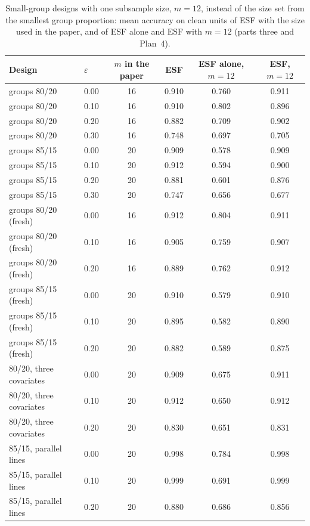 \begin{table}[htbp]
\centering
\small
\caption{Small-group designs with one subsample size, $m=12$, instead of the size set from the smallest group proportion: mean accuracy on clean units of ESF with the size used in the paper, and of ESF alone and ESF with $m=12$ (parts three and Plan~4).}
\label{tab:S28}
\begin{tabular}{llcccc}
\toprule
Design & $\varepsilon$ & $m$ in the paper & ESF & ESF alone, $m=12$ & ESF, $m=12$ \\
\midrule
groups 80/20 & 0.00 & 16 & 0.910 & 0.760 & 0.911 \\
groups 80/20 & 0.10 & 16 & 0.910 & 0.802 & 0.896 \\
groups 80/20 & 0.20 & 16 & 0.882 & 0.709 & 0.902 \\
groups 80/20 & 0.30 & 16 & 0.748 & 0.697 & 0.705 \\
groups 85/15 & 0.00 & 20 & 0.909 & 0.578 & 0.909 \\
groups 85/15 & 0.10 & 20 & 0.912 & 0.594 & 0.900 \\
groups 85/15 & 0.20 & 20 & 0.881 & 0.601 & 0.876 \\
groups 85/15 & 0.30 & 20 & 0.747 & 0.656 & 0.677 \\
groups 80/20 (fresh) & 0.00 & 16 & 0.912 & 0.804 & 0.911 \\
groups 80/20 (fresh) & 0.10 & 16 & 0.905 & 0.759 & 0.907 \\
groups 80/20 (fresh) & 0.20 & 16 & 0.889 & 0.762 & 0.912 \\
groups 85/15 (fresh) & 0.00 & 20 & 0.910 & 0.579 & 0.910 \\
groups 85/15 (fresh) & 0.10 & 20 & 0.895 & 0.582 & 0.890 \\
groups 85/15 (fresh) & 0.20 & 20 & 0.882 & 0.589 & 0.875 \\
80/20, three covariates & 0.00 & 20 & 0.909 & 0.675 & 0.911 \\
80/20, three covariates & 0.10 & 20 & 0.912 & 0.650 & 0.912 \\
80/20, three covariates & 0.20 & 20 & 0.830 & 0.651 & 0.831 \\
85/15, parallel lines & 0.00 & 20 & 0.998 & 0.784 & 0.998 \\
85/15, parallel lines & 0.10 & 20 & 0.999 & 0.691 & 0.999 \\
85/15, parallel lines & 0.20 & 20 & 0.880 & 0.686 & 0.856 \\
\bottomrule
\end{tabular}
\end{table}